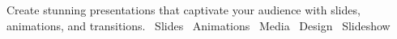   {Create stunning presentations that captivate your audience with slides, animations, and transitions.}
  {\faFilePowerpoint\ Slides \quad \faPlayCircle\ Animations \quad \faImage\ Media \quad \faPalette\ Design \quad \faTv\ Slideshow}
